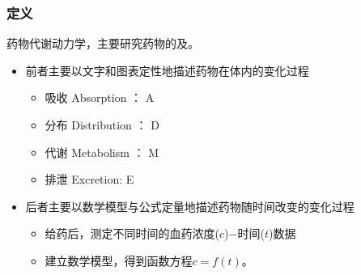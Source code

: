 \documentclass[dvipsnames, svgnames, x11names]{beamer}
\begin{document}
\begin{frame}
	\frametitle{定义}
	药物代谢动力学，主要研究药物的及。

	\begin{itemize}
	  \item 前者主要以文字和图表定性地描述药物在体内的变化过程
		\begin{itemize}
		  \item 吸收 Absorption ： A
		  \item 分布 Distribution ： D
		  \item 代谢 Metabolism ： M
		  \item 排泄 Excretion: E
		\end{itemize}
	  \item 后者主要以数学模型与公式定量地描述药物随时间改变的变化过程
		\begin{itemize}
		  \item 给药后，测定不同时间的血药浓度($c$)$-$时间($t$)数据
		  \item 建立数学模型，得到函数方程$c=f(t)$。
		\end{itemize}
	\end{itemize}
\end{frame}


    
\end{document}

